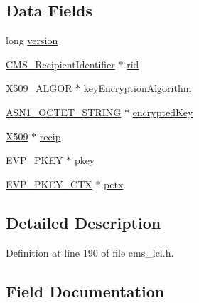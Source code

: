 \subsection*{Data Fields}
\begin{DoxyCompactItemize}
\item 
long \hyperlink{struct_c_m_s___key_trans_recipient_info__st_a17afc5cf84cee4b2123665f28ce85c9f}{version}
\item 
\hyperlink{cms__lcl_8h_a836bb2f688a31b7ec32eb11344d74350}{C\+M\+S\+\_\+\+Recipient\+Identifier} $\ast$ \hyperlink{struct_c_m_s___key_trans_recipient_info__st_a47ff08144afb9ee7ca032eb0551b3ce3}{rid}
\item 
\hyperlink{crypto_2ossl__typ_8h_aa2b6185e6254f36f709cd6577fb5022e}{X509\+\_\+\+A\+L\+G\+OR} $\ast$ \hyperlink{struct_c_m_s___key_trans_recipient_info__st_a02978e07483f6746f4f14141279dc4bb}{key\+Encryption\+Algorithm}
\item 
\hyperlink{crypto_2ossl__typ_8h_afbd05e94e0f0430a2b729473efec88c1}{A\+S\+N1\+\_\+\+O\+C\+T\+E\+T\+\_\+\+S\+T\+R\+I\+NG} $\ast$ \hyperlink{struct_c_m_s___key_trans_recipient_info__st_a683d211b1506ecf342fb4d35a34aed33}{encrypted\+Key}
\item 
\hyperlink{crypto_2ossl__typ_8h_a4f666bde6518f95deb3050c54b408416}{X509} $\ast$ \hyperlink{struct_c_m_s___key_trans_recipient_info__st_a9f1acebd072920ce93198557bb50e123}{recip}
\item 
\hyperlink{crypto_2ossl__typ_8h_a2fca4fef9e4c7a2a739b1ea04acb56ce}{E\+V\+P\+\_\+\+P\+K\+EY} $\ast$ \hyperlink{struct_c_m_s___key_trans_recipient_info__st_a76a3c5d8ec8f468075eb3e366a35a83c}{pkey}
\item 
\hyperlink{crypto_2ossl__typ_8h_aaadbb75633e4460a52864970a3b875de}{E\+V\+P\+\_\+\+P\+K\+E\+Y\+\_\+\+C\+TX} $\ast$ \hyperlink{struct_c_m_s___key_trans_recipient_info__st_a948d2b6093ada6d39976bf4970cd2959}{pctx}
\end{DoxyCompactItemize}


\subsection{Detailed Description}


Definition at line 190 of file cms\+\_\+lcl.\+h.



\subsection{Field Documentation}
